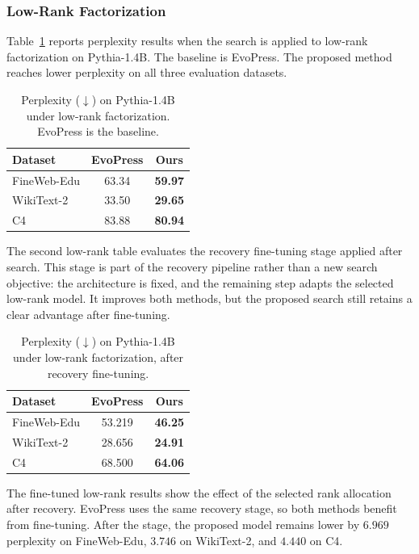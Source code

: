 \subsubsection{Low-Rank Factorization}
\label{subsec:lm-lowrank}

Table~\ref{tab:lm-lowrank} reports perplexity results when the search is applied to low-rank factorization on Pythia-1.4B. The baseline is EvoPress. The proposed method reaches lower perplexity on all three evaluation datasets.

\begin{table}[H]
\centering
\caption{Perplexity ($\downarrow$) on Pythia-1.4B under low-rank factorization. EvoPress is the baseline.}
\label{tab:lm-lowrank}
\begin{tabular}{lcc}
  \toprule
  \textbf{Dataset} & \textbf{EvoPress} & \textbf{Ours} \\
  \midrule
  FineWeb-Edu & 63.34 & \textbf{59.97} \\
  WikiText-2  & 33.50 & \textbf{29.65} \\
  C4          & 83.88 & \textbf{80.94} \\
  \bottomrule
\end{tabular}
\end{table}

The second low-rank table evaluates the recovery fine-tuning stage applied after search. This stage is part of the recovery pipeline rather than a new search objective: the architecture is fixed, and the remaining step adapts the selected low-rank model. It improves both methods, but the proposed search still retains a clear advantage after fine-tuning.

\begin{table}[H]
\centering
\caption{Perplexity ($\downarrow$) on Pythia-1.4B under low-rank factorization, after recovery fine-tuning.}
\label{tab:lm-lowrank-ft}
\begin{tabular}{lcc}
  \toprule
  \textbf{Dataset} & \textbf{EvoPress} & \textbf{Ours} \\
  \midrule
  FineWeb-Edu & 53.219 & \textbf{46.25} \\
  WikiText-2  & 28.656 & \textbf{24.91} \\
  C4          & 68.500 & \textbf{64.06} \\
  \bottomrule
\end{tabular}
\end{table}

The fine-tuned low-rank results show the effect of the selected rank allocation after recovery. EvoPress uses the same recovery stage, so both methods benefit from fine-tuning. After the stage, the proposed model remains lower by $6.969$ perplexity on FineWeb-Edu, $3.746$ on WikiText-2, and $4.440$ on C4.

